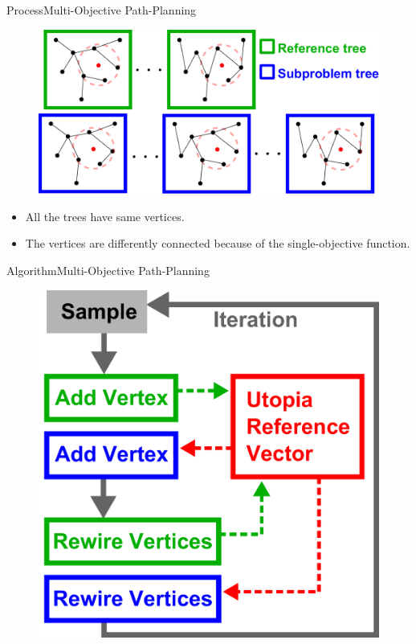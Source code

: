 \begin{frame}{Process}{Multi-Objective Path-Planning}
	\begin{figure}
		\centering
		\includegraphics[width=.7\linewidth]{figure/morrf.pdf}
		\label{fig:morrt:process}
	\end{figure}
	\begin{itemize}
		\item All the trees have same vertices.
		\item The vertices are differently connected because of the single-objective function.
	\end{itemize}
	
\end{frame}

\begin{frame}{Algorithm}{Multi-Objective Path-Planning}
	
	\begin{figure}[t]
		\centering
		\includegraphics[width=.5\linewidth]{figure/MORRF_alg}
	\end{figure}
	
\end{frame}


